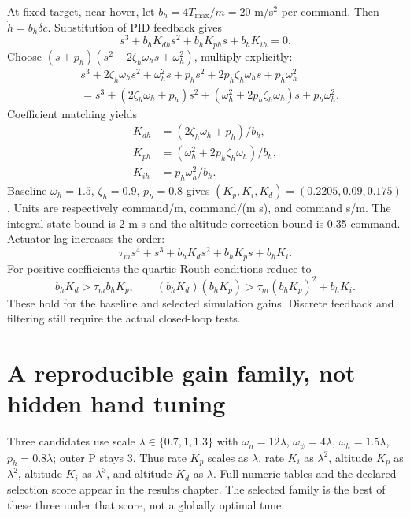 At fixed target, near hover, let $b_h=4T_{\max}/m=20$ m/s$^2$ per command.
Then $\ddot h=b_h\delta c$. Substitution of PID feedback gives
\begin{equation}
s^3+b_hK_{dh}s^2+b_hK_{ph}s+b_hK_{ih}=0.
\end{equation}
Choose $(s+p_h)(s^2+2\zeta_h\omega_hs+\omega_h^2)$, multiply explicitly:
\begin{align}
&s^3+2\zeta_h\omega_hs^2+\omega_h^2s
+p_hs^2+2p_h\zeta_h\omega_hs+p_h\omega_h^2\\
&=s^3+(2\zeta_h\omega_h+p_h)s^2
+(\omega_h^2+2p_h\zeta_h\omega_h)s+p_h\omega_h^2.
\end{align}
Coefficient matching yields
\begin{equation}\boxed{\begin{aligned}
K_{dh}&=(2\zeta_h\omega_h+p_h)/b_h,\\
K_{ph}&=(\omega_h^2+2p_h\zeta_h\omega_h)/b_h,\\
K_{ih}&=p_h\omega_h^2/b_h.
\end{aligned}}\end{equation}
Baseline $\omega_h=1.5$, $\zeta_h=0.9$, $p_h=0.8$ gives
$(K_p,K_i,K_d)=(0.2205,0.09,0.175)$. Units are respectively
command/m, command/(m s), and command s/m. The integral-state bound is
2 m s and the altitude-correction bound is 0.35 command.
Actuator lag increases the order:
\begin{equation}
\tau_m s^4+s^3+b_hK_d s^2+b_hK_p s+b_hK_i.
\end{equation}
For positive coefficients the quartic Routh conditions reduce to
\begin{equation}
b_hK_d>\tau_m b_hK_p,\qquad
(b_hK_d)(b_hK_p)>\tau_m(b_hK_p)^2+b_hK_i.
\end{equation}
These hold for the baseline and selected simulation gains. Discrete feedback
and filtering still require the actual closed-loop tests.

\section{A reproducible gain family, not hidden hand tuning}
Three candidates use scale $\lambda\in\{0.7,1,1.3\}$ with
$\omega_n=12\lambda$, $\omega_\psi=4\lambda$,
$\omega_h=1.5\lambda$, $p_h=0.8\lambda$; outer P stays 3.
Thus rate $K_p$ scales as $\lambda$, rate $K_i$ as $\lambda^2$,
altitude $K_p$ as $\lambda^2$, altitude $K_i$ as $\lambda^3$,
and altitude $K_d$ as $\lambda$. Full numeric tables and the declared selection
score appear in the results chapter. The selected family is the best of these
three under that score, not a globally optimal tune.

